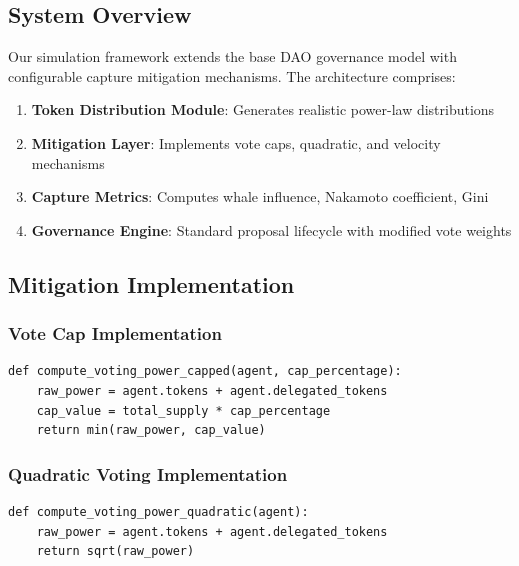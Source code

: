 
\subsection{System Overview}

Our simulation framework extends the base DAO governance model with configurable capture mitigation mechanisms. The architecture comprises:

\begin{enumerate}
    \item \textbf{Token Distribution Module}: Generates realistic power-law distributions
    \item \textbf{Mitigation Layer}: Implements vote caps, quadratic, and velocity mechanisms
    \item \textbf{Capture Metrics}: Computes whale influence, Nakamoto coefficient, Gini
    \item \textbf{Governance Engine}: Standard proposal lifecycle with modified vote weights
\end{enumerate}

\subsection{Mitigation Implementation}

\subsubsection{Vote Cap Implementation}

\begin{lstlisting}[caption=Vote cap mechanism (pseudocode)]
def compute_voting_power_capped(agent, cap_percentage):
    raw_power = agent.tokens + agent.delegated_tokens
    cap_value = total_supply * cap_percentage
    return min(raw_power, cap_value)
\end{lstlisting}

\subsubsection{Quadratic Voting Implementation}

\begin{lstlisting}[caption=Quadratic voting mechanism (pseudocode)]
def compute_voting_power_quadratic(agent):
    raw_power = agent.tokens + agent.delegated_tokens
    return sqrt(raw_power)
\end{lstlisting}

